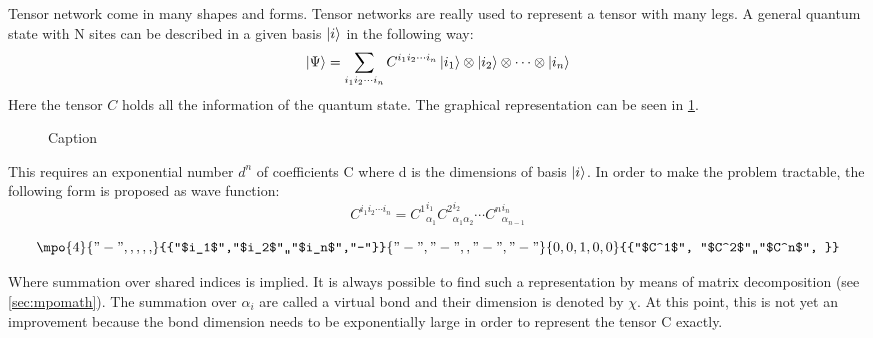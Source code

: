 Tensor network come in many shapes and forms. Tensor networks are really used to represent a tensor with many legs. A general quantum state with N sites can be described in a given basis $\ket{i}$ in the following way:
\begin{equation}
    \ket{\Psi} = \sum_{i_1 i_2 \cdots i_n } C^{i_1 i_2 \cdots i_n} \ket{i_1} \otimes \ket{i_2} \otimes \cdots \otimes \ket{i_n}
\end{equation}
Here the tensor $C$ holds all the information of the quantum state. The graphical representation can be seen in \cref{fig:tens:intro:C}.
\begin{figure}
    \centering


    \caption{Caption}
    \label{fig:tens:intro:C}
\end{figure}

This requires an exponential number $d^n$ of coefficients C where d is the dimensions of basis $\ket{i}$. In order to make the problem tractable, the following form is proposed as wave function:
\begin{equation}
    C^{i_1 i_2 \cdots i_n} = {C^{1}}_{\alpha_1}^{ i_1} {C^{2}}_{\alpha_1 \alpha_2}^{i_2} \cdots  {C^{n}}_{\alpha_{n-1} }^{i_n}
\end{equation}

\begin{equation}
    \mpo{4}{{"-",,,,,}}{{"$i_1$","$i_2$",,"$i_n$","-"}}{{"-","-",,"-","-"}}{{0,0,1,0,0}}{{"$C^1$", "$C^2$",,"$C^n$", }}
\end{equation}

Where summation over shared indices is implied. It is always possible to find such a representation by means of matrix decomposition (see \cref{sec:mpomath}). The summation over $\alpha_i$ are called a virtual bond and their dimension is denoted by $\chi$. At this point, this is not yet an improvement because the bond dimension needs to be exponentially large in order to represent the tensor C exactly.

